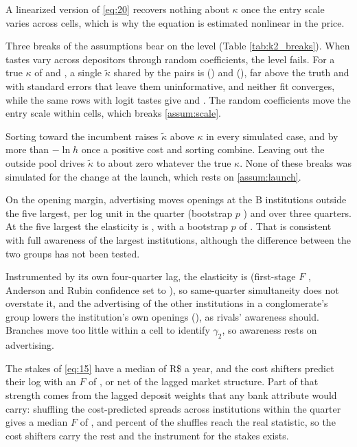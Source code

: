 A linearized version of \eqref{eq:20} recovers nothing about $\kappa$ once the entry scale varies across cells, which is why the equation is estimated nonlinear in the price.

Three breaks of the assumptions bear on the level (Table \ref{tab:k2_breaks}). When tastes vary across depositors through random coefficients, the level fails. For a true $\kappa$ of  and , a single $\tilde{\kappa}$ shared by the pairs is  () and  (), far above the truth and with standard errors that leave them uninformative, and neither fit converges, while the same rows with logit tastes give  and . The random coefficients move the entry scale within cells, which breaks \ref{assum:scale}.

Sorting toward the incumbent raises $\tilde{\kappa}$ above $\kappa$ in every simulated case, and by more than $-\ln h$ once a positive cost and sorting combine. Leaving out the outside pool drives $\tilde{\kappa}$ to about zero whatever the true $\kappa$. None of these breaks was simulated for the change at the launch, which rests on \ref{assum:launch}.

On the opening margin, advertising moves openings at the $\mathrm{B}$ institutions outside the five largest,  per log unit in the quarter (bootstrap $p$ ) and  over three quarters. At the five largest the elasticity is , with a bootstrap $p$ of . That is consistent with full awareness of the largest institutions, although the difference between the two groups has not been tested.

Instrumented by its own four-quarter lag, the elasticity is  (first-stage $F$ , Anderson and Rubin confidence set  to ), so same-quarter simultaneity does not overstate it, and the advertising of the other institutions in a conglomerate's group lowers the institution's own openings (), as rivals' awareness should.
Branches move too little within a cell to identify $\gamma_2$, so awareness rests on advertising.

The stakes of \eqref{eq:15} have a median of R\$ a year, and the cost shifters predict their log with an $F$ of , or  net of the lagged market structure. Part of that strength comes from the lagged deposit weights that any bank attribute would carry: shuffling the cost-predicted spreads across institutions within the quarter gives a median $F$ of , and  percent of the shuffles reach the real statistic, so the cost shifters carry the rest and the instrument for the stakes exists.

